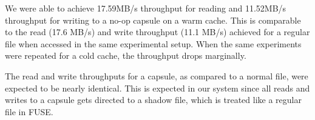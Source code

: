 We were able to achieve 17.59MB/s throughput for reading and 11.52MB/s throughput for writing to a no-op capsule on a warm cache. This is comparable to the read (17.6 MB/s) and write throughput (11.1 MB/s) achieved for a regular file when accessed in the same experimental setup. When the same experiments were repeated for a cold cache, the throughput drops marginally.

The read and write throughputs for a capsule, as compared to a normal
file, were expected to be nearly identical. This is expected in our
system since all reads and writes to a capsule gets directed to a
shadow file, which is treated like a regular file in FUSE.







